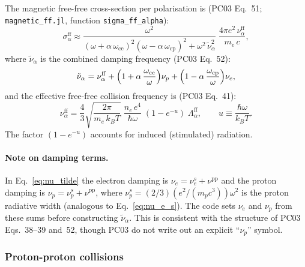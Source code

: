 \noindent
The magnetic free-free cross-section per polarisation is
(PC03 Eq.~51; \texttt{magnetic\_ff.jl}, function
\texttt{sigma\_ff\_alpha}):
%
\begin{equation}
\label{eq:sigma_ff}
\sigma_\alpha^{\mathrm{ff}}
  \approx \frac{\omega^2}
    {(\omega+\alpha\,\omega_{\mathrm{ce}})^2
     (\omega-\alpha\,\omega_{\mathrm{cp}})^2
     + \omega^2\,\tilde\nu_\alpha^2}\;
  \frac{4\pi e^2\,\nu_\alpha^{\mathrm{ff}}}{m_e\,c},
\end{equation}
%
where $\tilde\nu_\alpha$ is the combined damping frequency (PC03 Eq.~52):
%
\begin{equation}
\label{eq:nu_tilde}
\tilde\nu_\alpha
  = \nu_\alpha^{\mathrm{ff}}
  + \Bigl(1 + \alpha\,\frac{\omega_{\mathrm{ce}}}{\omega}\Bigr)\nu_p
  + \Bigl(1 - \alpha\,\frac{\omega_{\mathrm{cp}}}{\omega}\Bigr)\nu_e,
\end{equation}
%
and the effective free-free collision frequency is (PC03 Eq.~41):
%
\begin{equation}
\label{eq:nu_ff}
\nu_\alpha^{\mathrm{ff}}
  = \frac{4}{3}\sqrt{\frac{2\pi}{m_e\,k_B T}}\;
    \frac{n_e\,e^4}{\hbar\omega}\;
    (1-e^{-u})\;\Lambda_\alpha^{\mathrm{ff}},
  \qquad u \equiv \frac{\hbar\omega}{k_B T}.
\end{equation}
%
The factor $(1-e^{-u})$ accounts for induced (stimulated) radiation.

\paragraph{Note on damping terms.}
In Eq.~\eqref{eq:nu_tilde} the electron damping is
$\nu_e = \nu_e^s + \nu^{\mathrm{pp}}$
and the proton damping is
$\nu_p = \nu_p^s + \nu^{\mathrm{pp}}$,
where $\nu_p^s = (2/3)(e^2/(m_p c^3))\omega^2$ is the proton radiative
width (analogous to Eq.~\eqref{eq:nu_e_s}).
The code sets $\nu_e$ and $\nu_p$ from these sums before constructing
$\tilde\nu_\alpha$.  This is consistent with the structure of PC03
Eqs.~38--39 and~52, though PC03 do not write out an explicit
``$\nu_p$'' symbol.

\subsubsection{Proton-proton collisions}
\label{sec:opacity:mag:pp}

